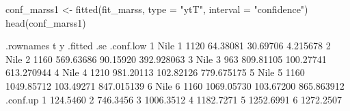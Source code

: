 \begin{Schunk}
\begin{Sinput}
 conf_marss1 <- fitted(fit_marss, type = "ytT", interval = "confidence")
 head(conf_marss1)
\end{Sinput}
\begin{Soutput}
  .rownames t    y    .fitted       .se  .conf.low
1      Nile 1 1120   64.38081  30.69706   4.215678
2      Nile 2 1160  569.63686  90.15920 392.928063
3      Nile 3  963  809.81105 100.27741 613.270944
4      Nile 4 1210  981.20113 102.82126 779.675175
5      Nile 5 1160 1049.85712 103.49271 847.015139
6      Nile 6 1160 1069.05730 103.67200 865.863912
   .conf.up
1  124.5460
2  746.3456
3 1006.3512
4 1182.7271
5 1252.6991
6 1272.2507
\end{Soutput}
\end{Schunk}
